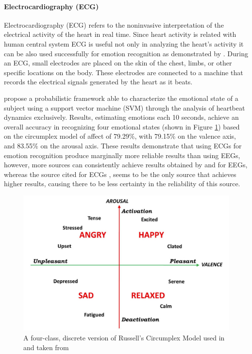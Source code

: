\documentclass[12pt, a4paper]{article}
\newcommand{\np}
    {
    \vskip 0.4cm
    }
\begin{document}
\paragraph{Electrocardiography (ECG)}

Electrocardiography (ECG) refers to the noninvasive interpretation of the electrical activity of the heart in real time. Since heart activity is related with human central system ECG is useful not only in analyzing the heart's activity it can be also used successfully for emotion recognition as demonstrated by \cite{goshvarpour2017emotion}. During an ECG, small electrodes are placed on the skin of the chest, limbs, or other specific locations on the body. These electrodes are connected to a machine that records the electrical signals generated by the heart as it beats.
\np
\cite{valenza2014revealing} propose a probabilistic framework able to characterize the emotional state of a subject using a support vector machine (SVM) through the analysis of heartbeat dynamics exclusively. Results, estimating emotions each 10 seconds, achieve an overall accuracy in recognizing four emotional states (shown in Figure \ref{fig:4circum}) based on the circumplex model of affect of 79.29\%, with 79.15\% on the valence axis, and 83.55\% on the arousal axis. These results demonstrate that using ECGs for emotion recognition produce marginally more reliable results than using EEGs, however, more sources can consistently achieve results obtained by \cite{wu2017estimation} and \cite{li2018emotion} for EEGs, whereas the source cited for ECGs \citep{valenza2014revealing}, seems to be the only source that achieves higher results, causing there to be less certainty in the reliability of this source.

\begin{figure}[H]
    \centering
    \includegraphics[scale=0.41]{images/4circum.png}
    \caption{A four-class, discrete version of Russell's Circumplex Model used in and taken from \cite{valenza2014revealing}}
    \label{fig:4circum}
\end{figure}
\end{document}

